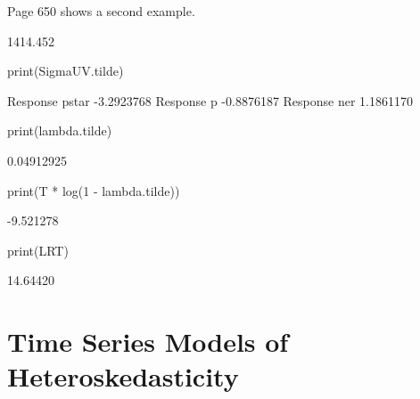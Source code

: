 \documentclass[a4paper]{article}
\renewcommand{\~}{\perispomeni}%
\begin{document}
Page 650 shows a second example.
\begin{Schunk}
\begin{Soutput}
         [,1]
[1,] 1414.452
\end{Soutput}
\begin{Sinput}
 print(SigmaUV.tilde)
\end{Sinput}
\begin{Soutput}
                     [,1]
Response pstar -3.2923768
Response p     -0.8876187
Response ner    1.1861170
\end{Soutput}
\begin{Sinput}
 print(lambda.tilde)
\end{Sinput}
\begin{Soutput}
[1] 0.04912925
\end{Soutput}
\begin{Sinput}
 print(T * log(1 - lambda.tilde))
\end{Sinput}
\begin{Soutput}
[1] -9.521278
\end{Soutput}
\begin{Sinput}
 print(LRT)
\end{Sinput}
\begin{Soutput}
[1] 14.64420
\end{Soutput}
\end{Schunk}
\section{Time Series Models of Heteroskedasticity}
\end{document}
